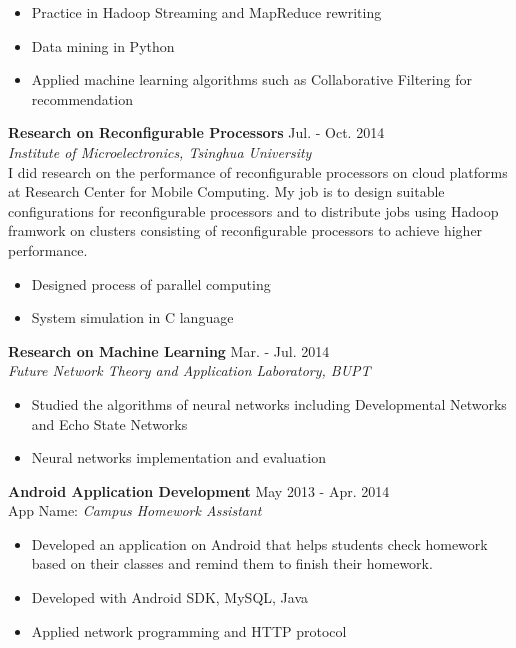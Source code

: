 \documentclass[margin,10pt]{res} %
\begin{document}
\begin{resume}
\begin{itemize}  %
\item Practice in Hadoop Streaming and MapReduce rewriting
\item Data mining in Python
\item Applied machine learning algorithms such as Collaborative Filtering for recommendation%
\end{itemize}

{\bf Research on Reconfigurable Processors} \hfill Jul. - Oct. 2014 \\
\textit{Institute of Microelectronics, Tsinghua University}\\
I did research on the performance of reconfigurable processors on cloud platforms at Research Center for Mobile Computing. My job is to design suitable configurations for reconfigurable processors and to distribute jobs using Hadoop framwork on clusters consisting of reconfigurable processors to achieve higher performance.
\begin{itemize}
\item Designed process of parallel computing
\item System simulation in C language
\end{itemize}

{\bf Research on Machine Learning} \hfill Mar. - Jul. 2014 \\
\textit{Future Network Theory and Application Laboratory, BUPT}
\begin{itemize}
\item Studied the algorithms of neural networks including Developmental Networks and Echo State Networks
\item Neural networks implementation and evaluation
\end{itemize}

{\bf Android Application Development} \hfill May 2013 - Apr. 2014 \\
App Name: \textit{Campus Homework Assistant}
\begin{itemize}
\item Developed an application on Android that helps students check homework based on their classes and remind them to finish their homework.
\item Developed with Android SDK, MySQL, Java
\item Applied network programming and HTTP protocol
\end{itemize}


\end{resume}
\end{document}
